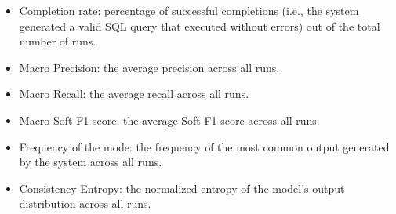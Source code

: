 \begin{itemize}
       \item Completion rate: percentage of successful completions (i.e., the system generated a valid SQL query that executed without errors) out of the total number of runs.
       \item Macro Precision: the average precision across all runs.
       \item Macro Recall: the average recall across all runs.
       \item Macro Soft F1-score: the average Soft F1-score across all runs.
       \item Frequency of the mode: the frequency of the most common output generated by the system across all runs.
       \item Consistency Entropy: the normalized entropy of the model's output distribution across all runs.
\end{itemize}
   